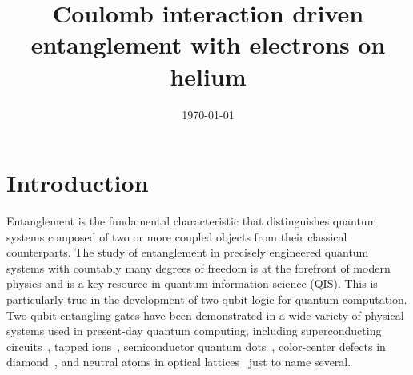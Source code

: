 \documentclass[%
 reprint,
 amsmath,amssymb,
 aps,
]{revtex4-2}
\begin{document}

\title{Coulomb interaction driven entanglement with electrons on helium}


\date{\today}%


\maketitle

\section{Introduction} %
Entanglement is the fundamental characteristic that distinguishes
quantum systems composed of two or more coupled objects from their classical counterparts. The study of entanglement in precisely engineered quantum systems with countably many degrees of freedom is at the forefront of modern physics and is a key resource in quantum information science (QIS). This is particularly true in the development of two-qubit logic for quantum computation. Two-qubit entangling gates have been demonstrated in a wide variety of physical systems used in present-day quantum computing, including superconducting circuits~\cite{Steffen1423}, tapped ions~\cite{}, semiconductor quantum dots~\cite{Li809}, color-center defects in diamond~\cite{}, and neutral atoms in optical lattices~\cite{Saffman1010} just to name several. 
\end{document}
